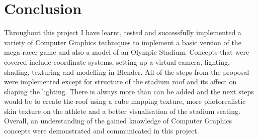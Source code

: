 \documentclass[a4 paper, 12pt]{article}
\begin{document}
\section{Conclusion}
Throughout this project I have learnt, tested and successfully implemented a variety of Computer Graphics techniques to implement a basic version of the mega racer game and also a model of an Olympic Stadium. Concepts that were covered include coordinate systems, setting up a virtual camera, lighting, shading, texturing and modelling in Blender. All of the steps from the proposal were implemented except for structure of the stadium roof and its affect on shaping the lighting. There is always more than can be added and the next steps would be to create the roof using a cube mapping texture, more photorealistic skin texture on the athlete and a better visualisation of the stadium seating. Overall, an understanding of the gained knowledge of Computer Graphics concepts were demonstrated and communicated in this project.




\end{document}
